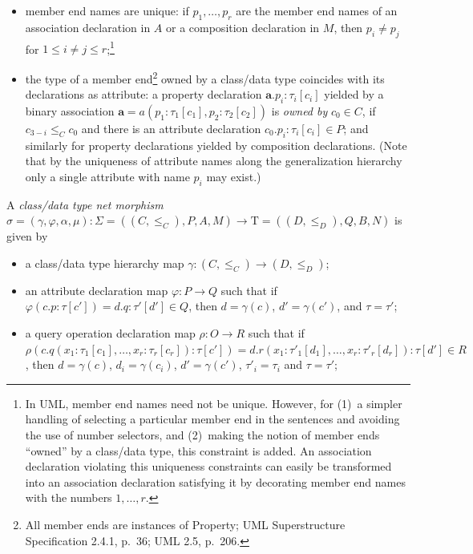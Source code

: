 \documentclass[10pt,fleqn,final]{scrreprt}
\newenvironment{definitions}[0]{\medskip }{}
\newcommand{\uml}[1]{\textsf{#1}}
\newcommand{\Tau}{\mathrm{T}}
\begin{document}
\begin{definitions}
\begin{itemize}[label={--}, leftmargin=*]
  \item member end names are unique: if $p_1, \ldots, p_r$ are the
member end names of an association declaration in $A$ or a composition
declaration in $M$, then $p_i \neq p_j$ for
$1 \leq i \neq j \leq r$;\footnote{In UML, member end names need not be
  unique.  However, for (1)~a simpler handling of selecting a particular
  member end in the sentences and avoiding the use of number selectors,
  and (2)~making the notion of member ends ``owned'' by a class/data
  type, this constraint is added. An association declaration violating this
  uniqueness constraints can easily be transformed into an association 
  declaration satisfying it by decorating member end names with the
  numbers $1,\ldots,r$.}

  \item the type of a member end\footnote{All member ends are instances
  of \uml{Property}; UML Superstructure Specification 2.4.1, p.~36; UML
  2.5, p.~206.}
owned by a class/data type coincides with its declarations as attribute:
a property declaration $\mathbf{a}.p_i : \tau_i[c_i]$
yielded by a binary association
$\mathbf{a} = a(p_1 : \tau_1[c_1], p_2 : \tau_2[c_2])$ is \emph{owned
  by} $c_0 \in C$, if $c_{3-i} \leq_C c_0$ and there is an attribute
declaration $c_0.p_i : \tau_i[c_i] \in P$; and similarly for property
declarations yielded by composition declarations.  (Note that by the
uniqueness of attribute names along the generalization hierarchy only a
single attribute with name $p_i$ may exist.)
\end{itemize}

A \emph{class/data type net morphism}
$\sigma = (\gamma, \varphi, \alpha, \mu) : \Sigma = ((C,
{\leq}_C), P, A, M) \to \Tau = ((D, {\leq}_D),\allowbreak
Q,\allowbreak B, N)$ is given by
%
\begin{itemize}[label={--}, leftmargin=*]
  \item a class/data type hierarchy map $\gamma : (C, {\leq_C}) \to (D,
{\leq_D})$;

  \item an attribute declaration map $\varphi : P \to Q$ such that if
$\varphi({c.p : \tau[c']}) = {d.q : \tau'[d']} \in Q$, then
$d = \gamma(c)$, $d' = \gamma(c')$, and $\tau = \tau'$;

  \item a query operation declaration map $\rho : O \to R$ such that if
$\rho(c.q(x_1 : \tau_1[c_1], \dots, x_r : \tau_r[c_r]) : \tau[c']) =
d.r(x_1 : \tau'_1[d_1], \dots, x_r : \tau'_r[d_r]) : \tau[d'] \in R$, 
then $d = \gamma(c)$, $d_i = \gamma(c_i)$, 
$d' = \gamma(c')$, $\tau'_i = \tau_i$ and $\tau = \tau'$;


\end{itemize}
\end{definitions}
\end{document}
